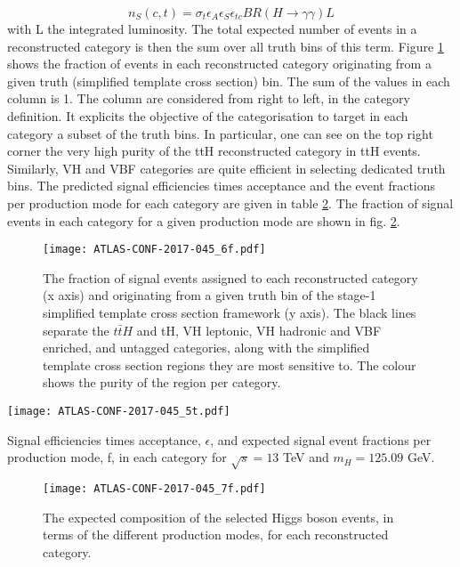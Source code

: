 \begin{equation}
n_S (c, t) = \sigma_{t}\epsilon_A\epsilon_S \epsilon_{tc} BR(H\rightarrow\gamma\gamma) L
\end{equation}
with L the integrated luminosity.
The total expected number of events in a reconstructed category is then the sum over all truth bins of this term.
Figure \ref{fig:orgc7e9fde} shows the fraction of events in each reconstructed category originating from a given truth (simplified template cross section) bin.
The sum of the values in each column is 1.
The column are considered from right to left, in the category definition.
It explicits the objective of the categorisation to target in each category a subset of the truth bins.
In particular, one can see on the top right corner the very high purity of the ttH reconstructed category in ttH events.
Similarly, VH and VBF categories are quite efficient in selecting dedicated truth bins.
The predicted signal efficiencies times acceptance and the event fractions per production mode for each category are given in table \ref{fig:HGam_fracProdMode}.
The fraction of signal events in each category for a given production mode are shown in fig. \ref{fig:HGam_fracProdMode}.

\begin{figure}[htbp]
\centering
\texttt{[image: ATLAS-CONF-2017-045\_6f.pdf]}
\caption{\label{fig:orgc7e9fde}
  The fraction of signal events assigned to each reconstructed category (x axis) and originating from a given truth bin of the stage-1 simplified template cross section framework (y axis).
  The black lines separate the $t\bar{t}H$ and tH, VH leptonic, VH hadronic and VBF enriched, and untagged categories, along with the simplified template cross section regions they are most sensitive to.
  The colour shows the purity of the region per category.
  \cite{ATLAS-CONF-2017-045}}
\end{figure}

\begin{table}[htbp]
\centering
\texttt{[image: ATLAS-CONF-2017-045\_5t.pdf]}
\caption{\label{fig:HGam_fracProdMode}
  Signal efficiencies times acceptance, $\epsilon$, and expected signal event fractions per production mode, f, in each  category for $\sqrt{s} = 13$ TeV and $m_H = 125.09$ GeV.
  \cite{ATLAS-CONF-2017-045}}
\end{table}

\begin{figure}[htbp]
\centering
\texttt{[image: ATLAS-CONF-2017-045\_7f.pdf]}
\caption{\label{fig:HGam_fracProdMode}
  The expected composition of the selected Higgs boson events, in terms of the different production modes, for each reconstructed category.\cite{ATLAS-CONF-2017-045}}
\end{figure}

